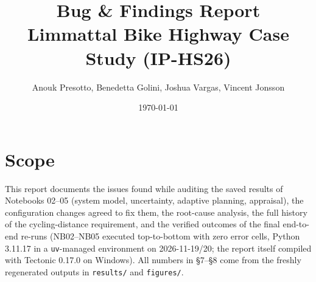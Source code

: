 \documentclass[11pt,a4paper]{article}
\title{Bug \& Findings Report\\[2pt]\large Limmattal Bike Highway Case Study (IP-HS26)}
\author{Anouk Presotto, Benedetta Golini, Joshua Vargas, Vincent Jonsson}
\date{\today}
\begin{document}
\maketitle

\section*{Scope}
This report documents the issues found while auditing the saved results of
Notebooks 02--05 (system model, uncertainty, adaptive planning, appraisal),
the configuration changes agreed to fix them, the root-cause analysis, the
full history of the cycling-distance requirement, and the verified outcomes of
the final end-to-end re-runs (NB02--NB05 executed top-to-bottom with zero error
cells, Python 3.11.17 in a \texttt{uv}-managed environment on 2026-11-19/20;
the report itself compiled with Tectonic 0.17.0 on Windows). All numbers in
\S7--\S8 come from the freshly regenerated outputs in \texttt{results/} and
\texttt{figures/}.
\end{document}
